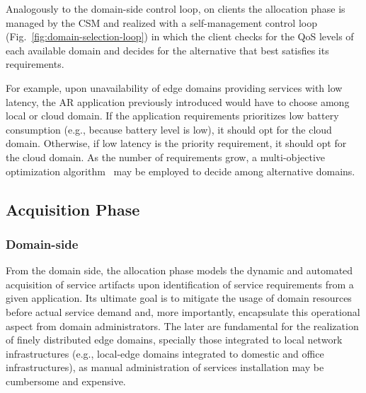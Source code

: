 Analogously to the domain-side control loop, on clients the allocation phase is managed by the CSM  and realized with a self-management control loop (Fig.~\ref{fig:domain-selection-loop}) in which the client checks for the QoS levels of each available domain and decides for the alternative that best satisfies its requirements. 

For example, upon unavailability of edge domains providing services with low latency, the AR application previously introduced would have to choose among local or cloud domain. If the application requirements prioritizes low battery consumption (e.g., because battery level is low), it should opt for the cloud domain. Otherwise, if low latency is the priority requirement, it should opt for the cloud domain. As the number of requirements grow, a multi-objective optimization algorithm~\cite{Olson1996} may be employed to decide among alternative domains.






\subsection{Acquisition Phase}\label{sec:A3-E-acquisition}


\subsubsection*{Domain-side} From the domain side, the allocation phase models the dynamic and automated acquisition of service artifacts upon identification of service requirements from a given application. Its ultimate goal is to mitigate the usage of domain resources before actual service demand and, more importantly, encapsulate this operational aspect from domain administrators. The later are fundamental for the realization of finely distributed edge domains, specially those integrated to local network infrastructures (e.g., local-edge domains integrated to domestic and office infrastructures), as manual administration of services installation may be cumbersome and expensive.

